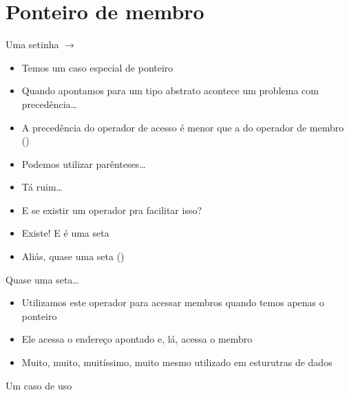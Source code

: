 \documentclass[14pt]{beamer}
\begin{document}
	\section{Ponteiro de membro}
		\begin{frame}{Uma setinha $\rightarrow$}
			\begin{itemize}
				\presentationPause\item Temos um caso especial de ponteiro
				\presentationPause\item Quando apontamos para um tipo abstrato acontece um problema com precedência\dots
				\presentationPause\item A precedência do operador de acesso é menor que a do operador de membro ()
				\presentationPause\item Podemos utilizar parênteses\dots
			\end{itemize}
			\presentationPause
			\begin{itemize}
				\presentationPause\item Tá ruim\dots
				\presentationPause\item E se existir um operador pra facilitar isso?
				\presentationPause\item Existe! \presentationPause E é uma seta
				\presentationPause\item Aliás, quase uma seta (\basicCode{->})
			\end{itemize}
		\end{frame}

		\begin{frame}{Quase uma seta\dots}
			\presentationPause
			\begin{itemize}
				\presentationPause\item Utilizamos este operador para acessar membros quando temos apenas o ponteiro
				\presentationPause\item Ele acessa o endereço apontado e, lá, acessa o membro
				\presentationPause\item Muito\presentationPause, muito\presentationPause, muitíssimo\presentationPause, muito mesmo utilizado em esturutras de dados
			\end{itemize}
		\end{frame}

		\begin{frame}{Um caso de uso}
			\presentationPause
		\end{frame}
\end{document}
